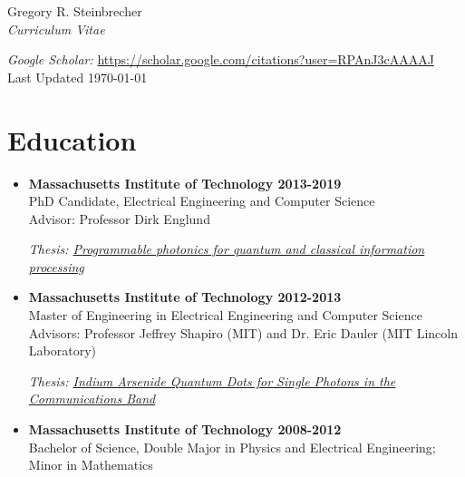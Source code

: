 \documentclass[letterpaper,12pt]{article}
\begin{document}
\begin{center}
  {\huge Gregory R. Steinbrecher}\\
  \vspace{2mm}
{\large \emph{Curriculum Vitae}}\\
\vspace{2mm}

{\small \emph{Google Scholar:} \href{https://scholar.google.com/citations?user=RPAnJ3cAAAAJ}{{https://scholar.google.com/citations?user=RPAnJ3cAAAAJ}}}\\
\vspace{5mm}
{\small Last Updated \today}\\
\end{center}

\section{Education}

\begin{itemize}

\item \textbf{Massachusetts Institute of Technology 2013-2019}\\
PhD Candidate, Electrical Engineering and Computer Science\\
Advisor: Professor Dirk Englund

{\small \emph{Thesis: \href{https://dspace.mit.edu/handle/1721.1/122554}{{Programmable photonics for quantum and classical information processing
}}}}


\item \textbf{Massachusetts Institute of Technology 2012-2013}\\
Master of Engineering in Electrical Engineering and Computer Science\\
Advisors: Professor Jeffrey Shapiro (MIT) and Dr. Eric Dauler (MIT Lincoln Laboratory)

{\small \emph{Thesis: \href{https://dspace.mit.edu/handle/1721.1/85227}{{Indium Arsenide Quantum Dots for Single Photons in the Communications Band}}}}

\item \textbf{Massachusetts Institute of Technology 2008-2012}\\
Bachelor of Science, Double Major in Physics and Electrical Engineering; Minor in  Mathematics

\end{itemize}
\end{document}

